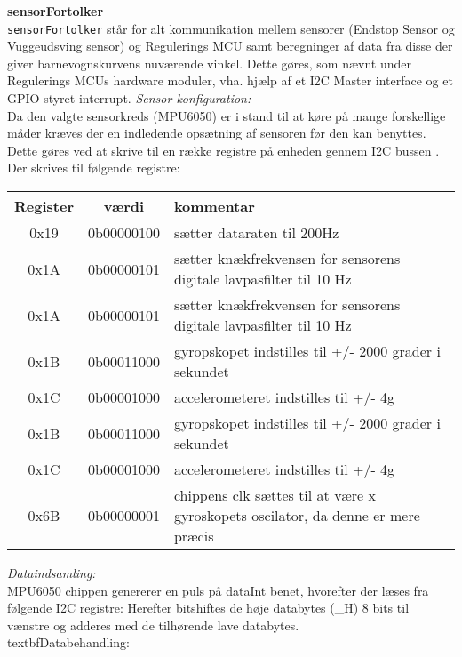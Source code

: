 \label{vugsys:impl, sensFortolk}\textbf{sensorFortolker}  \\
\verb+sensorFortolker+ står for alt kommunikation mellem sensorer (Endstop Sensor og Vuggeudsving sensor) og Regulerings MCU samt beregninger af data fra disse der giver barnevognskurvens nuværende vinkel. Dette gøres, som nævnt under Regulerings MCUs hardware moduler, vha. hjælp af et I2C Master interface og et GPIO styret interrupt. 
\textit{Sensor konfiguration:} \\
Da den valgte sensorkreds (MPU6050) er i stand til at køre på mange forskellige måder kræves der en indledende opsætning af sensoren før den kan benyttes. Dette gøres ved at skrive til en række registre på enheden gennem I2C bussen \citep{I2C}. Der skrives til følgende registre:
\begin{center}
    \begin{tabular}{| c | c | p{8cm} |}
    \hline
    \textbf{Register}	& \textbf{værdi} & \textbf{kommentar} \\ \hline
    0x19 & 0b00000100 & sætter dataraten til 200Hz \\
    0x1A & 0b00000101 & sætter knækfrekvensen for sensorens digitale lavpasfilter til 10 Hz \\
    0x1A & 0b00000101 & sætter knækfrekvensen for sensorens digitale lavpasfilter til 10 Hz \\
    0x1B & 0b00011000 & gyropskopet indstilles til +/- 2000 grader i sekundet  \\
    0x1C & 0b00001000 & accelerometeret indstilles til +/- 4g \\
    0x1B & 0b00011000 & gyropskopet indstilles til +/- 2000 grader i sekundet  \\
    0x1C & 0b00001000 & accelerometeret indstilles til +/- 4g \\
    0x6B & 0b00000001 & chippens clk sættes til at være x gyroskopets oscilator, da denne er mere præcis \\ \hline
    \end{tabular}
\end{center}
\textit{Dataindsamling:} \\
MPU6050 chippen genererer en puls på dataInt benet, hvorefter der læses fra følgende I2C registre:
Herefter bitshiftes de høje databytes (\_H) 8 bits til vænstre og adderes med de tilhørende lave databytes.\\
textbf{Databehandling:} \\

